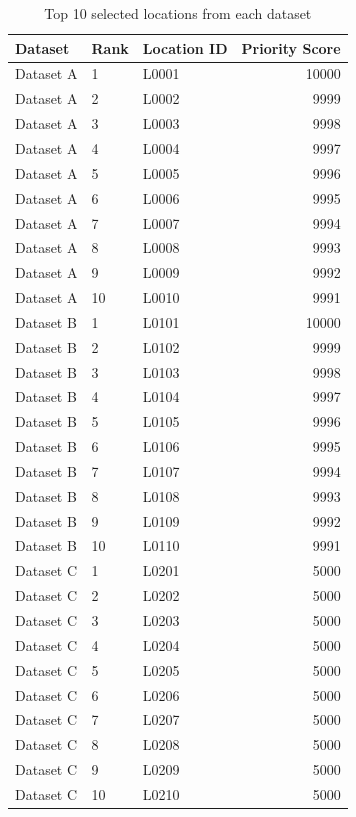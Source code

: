 \documentclass[12pt,a4paper,twocolumn,openany]{report}
\begin{document}
\begin{table}[t]
\centering
\caption{Top 10 selected locations from each dataset}
\label{tab:top10}
\scriptsize
\begin{tabular}{lllr}
\toprule
Dataset & Rank & Location ID & Priority Score \\
\midrule
Dataset A & 1 & L0001 & 10000 \\
Dataset A & 2 & L0002 & 9999 \\
Dataset A & 3 & L0003 & 9998 \\
Dataset A & 4 & L0004 & 9997 \\
Dataset A & 5 & L0005 & 9996 \\
Dataset A & 6 & L0006 & 9995 \\
Dataset A & 7 & L0007 & 9994 \\
Dataset A & 8 & L0008 & 9993 \\
Dataset A & 9 & L0009 & 9992 \\
Dataset A & 10 & L0010 & 9991 \\
Dataset B & 1 & L0101 & 10000 \\
Dataset B & 2 & L0102 & 9999 \\
Dataset B & 3 & L0103 & 9998 \\
Dataset B & 4 & L0104 & 9997 \\
Dataset B & 5 & L0105 & 9996 \\
Dataset B & 6 & L0106 & 9995 \\
Dataset B & 7 & L0107 & 9994 \\
Dataset B & 8 & L0108 & 9993 \\
Dataset B & 9 & L0109 & 9992 \\
Dataset B & 10 & L0110 & 9991 \\
Dataset C & 1 & L0201 & 5000 \\
Dataset C & 2 & L0202 & 5000 \\
Dataset C & 3 & L0203 & 5000 \\
Dataset C & 4 & L0204 & 5000 \\
Dataset C & 5 & L0205 & 5000 \\
Dataset C & 6 & L0206 & 5000 \\
Dataset C & 7 & L0207 & 5000 \\
Dataset C & 8 & L0208 & 5000 \\
Dataset C & 9 & L0209 & 5000 \\
Dataset C & 10 & L0210 & 5000 \\
\bottomrule
\end{tabular}
\end{table}
\end{document}
